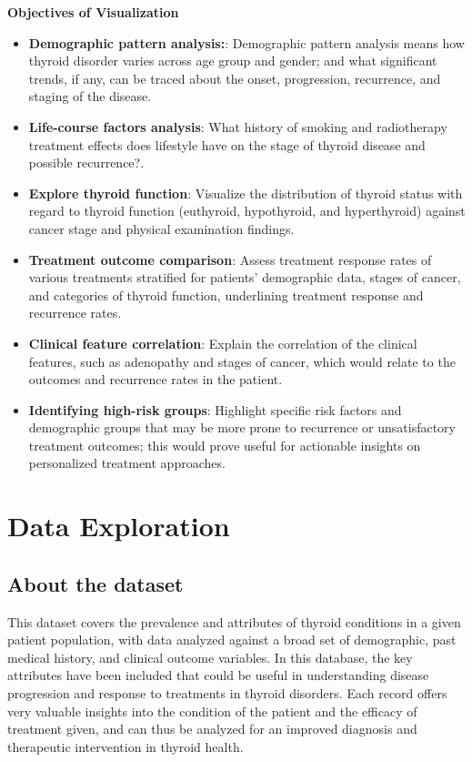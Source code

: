 \documentclass[12pt]{article}
\begin{document}
\textbf{ Objectives of Visualization}
\begin{itemize}

    \item \textbf{ Demographic pattern analysis:}: Demographic pattern analysis means how thyroid disorder varies across age group and gender; and what significant trends, if any, can be traced about the onset, progression, recurrence, and staging of the disease.

\item \textbf{ Life-course factors analysis}: What history of smoking and radiotherapy treatment effects does lifestyle have on the stage of thyroid disease and possible recurrence?.

\item \textbf{ Explore thyroid function}: Visualize the distribution of thyroid status with regard to thyroid function (euthyroid, hypothyroid, and hyperthyroid) against cancer stage and physical examination findings.

\item \textbf{ Treatment outcome comparison}: Assess treatment response rates of various treatments stratified for patients' demographic data, stages of cancer, and categories of thyroid function, underlining treatment response and recurrence rates.

\item \textbf{ Clinical feature correlation}: Explain the correlation of the clinical features, such as adenopathy and stages of cancer, which would relate to the outcomes and recurrence rates in the patient.

\item \textbf{ Identifying high-risk groups}: Highlight specific risk factors and demographic groups that may be more prone to recurrence or unsatisfactory treatment outcomes; this would prove useful for actionable insights on personalized treatment approaches.
\end{itemize}

\newpage 


\section{Data Exploration}

\subsection{About the dataset}
This dataset covers the prevalence and attributes of thyroid conditions in a given patient population, with data analyzed against a broad set of demographic, past medical history, and clinical outcome variables. In this database, the key attributes have been included that could be useful in understanding disease progression and response to treatments in thyroid disorders. Each record offers very valuable insights into the condition of the patient and the efficacy of treatment given, and can thus be analyzed for an improved diagnosis and therapeutic intervention in thyroid health.
\vspace{0.5cm}
\end{document}

